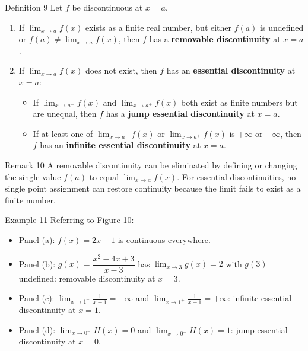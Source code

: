 \begin{definitionbox}{Definition 9}
Let \(f\) be discontinuous at \(x = a\).
\begin{enumerate}
    \item If \(\displaystyle\lim_{x \to a} f(x)\) exists as a finite real number, but either \(f(a)\) is undefined or \(f(a) \neq \displaystyle\lim_{x \to a} f(x)\), then \(f\) has a \textbf{removable discontinuity} at \(x = a\).

    \item If \(\displaystyle\lim_{x \to a} f(x)\) does not exist, then \(f\) has an \textbf{essential discontinuity} at \(x = a\):
    \begin{itemize}
        \item[\textbf{(a)}] If \(\displaystyle\lim_{x \to a^{-}} f(x)\) and \(\displaystyle\lim_{x \to a^{+}} f(x)\) both exist as finite numbers but are unequal, then \(f\) has a \textbf{jump essential discontinuity} at \(x = a\).
        \item[\textbf{(b)}] If at least one of \(\displaystyle\lim_{x \to a^{-}} f(x)\) or \(\displaystyle\lim_{x \to a^{+}} f(x)\) is \(+\infty\) or \(-\infty\), then \(f\) has an \textbf{infinite essential discontinuity} at \(x = a\).
    \end{itemize}
\end{enumerate}
\end{definitionbox}

\begin{remarkbox}{Remark 10}
A removable discontinuity can be eliminated by defining or changing the single value \(f(a)\) to equal \(\displaystyle\lim_{x \to a} f(x)\). For essential discontinuities, no single point assignment can restore continuity because the limit fails to exist as a finite number.
\end{remarkbox}

\begin{examplebox}{Example 11}
Referring to Figure 10:
\begin{itemize}
    \item Panel (a): \(f(x) = 2x + 1\) is continuous everywhere.
    \item Panel (b): \(g(x) = \dfrac{x^{2} - 4x + 3}{x - 3}\) has \(\displaystyle\lim_{x \to 3} g(x) = 2\) with \(g(3)\) undefined: removable discontinuity at \(x = 3\).
    \item Panel (c): \(\displaystyle\lim_{x \to 1^{-}} \frac{1}{x-1} = -\infty\) and \(\displaystyle\lim_{x \to 1^{+}} \frac{1}{x-1} = +\infty\): infinite essential discontinuity at \(x = 1\).
    \item Panel (d): \(\displaystyle\lim_{x \to 0^{-}} H(x) = 0\) and \(\displaystyle\lim_{x \to 0^{+}} H(x) = 1\): jump essential discontinuity at \(x = 0\).
\end{itemize}
\end{examplebox}

